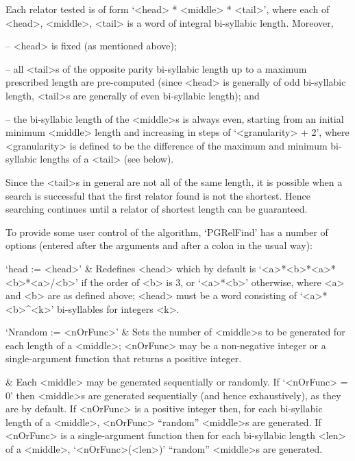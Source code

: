 Each relator tested is of form `<head> *  <middle>  *  <tail>',  where
each of <head>, <middle>, <tail> is a  word  of  integral  bi-syllabic
length. Moreover,

\beginlist

\item{--} <head> is fixed (as mentioned above); 

\item{--} all <tail>s of the opposite parity bi-syllabic length up  to
a  maximum  prescribed  length  are  pre-computed  (since  <head>   is
generally of odd bi-syllabic length, <tail>s  are  generally  of  even
bi-syllabic length); and

\item{--} the bi-syllabic length of  the  <middle>s  is  always  even,
starting from an initial minimum <middle>  length  and  increasing  in
steps of `<granularity> + 2', where <granularity> is defined to be the
difference of the maximum and minimum bi-syllabic lengths of a  <tail>
(see below).

\endlist

Since the <tail>s in general are not all of the  same  length,  it  is
possible when a search is successful that the first relator  found  is
not the  shortest.  Hence  searching  continues  until  a  relator  of
shortest length can be guaranteed.

To provide some user control  of  the  algorithm,  `PGRelFind'  has  a
number of options (entered after the arguments and after  a  colon  in
the usual way):

\beginitems

\quad`head := <head>' & 
Redefines <head> which by default is `<a>*<b>*<a>*<b>*<a>/<b>' if  the
order of <b> is 3, or `<a>*<b>' otherwise, where <a> and  <b>  are  as
defined above; <head> must  be  a  word  consisting  of  `<a>*<b>^<k>'
bi-syllables for integers <k>.

\quad`Nrandom := <nOrFunc>' & 
Sets the number of <middle>s to be generated  for  each  length  of  a
<middle>; <nOrFunc> may be a non-negative integer or a single-argument
function that returns a positive integer.

&
Each <middle> may be generated sequentially or randomly. If `<nOrFunc>
=  0'  then  <middle>s   are   generated   sequentially   (and   hence
exhaustively), as they are by default.  If  <nOrFunc>  is  a  positive
integer then, for each bi-syllabic length  of  a  <middle>,  <nOrFunc>
``random'' <middle>s are generated. If <nOrFunc> is a  single-argument
function then  for  each  bi-syllabic length  <len>  of  a  <middle>,
`<nOrFunc>(<len>)' ``random'' <middle>s are generated.

